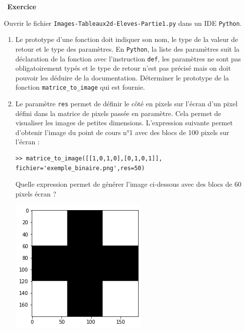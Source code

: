 \documentclass[a4paper, french, 12pt]{article}
\newcounter{exo}
\newenvironment{exercice}[1]
{\par \medskip   \addtocounter{exo}{1} \noindent  
\begin{bclogo}[arrondi =0.1,   noborder = true, logo=\bccrayon, marge=4]{~\textbf{Exercice} \textbf{\theexo} {\itshape #1} }  \par}
{
\end{bclogo}
 \par \bigskip }
\newcounter{def}
\newcounter{cours}
\begin{document}
\begin{exercice}{}

Ouvrir le fichier \texttt{Images-Tableaux2d-Eleves-Partie1.py} dans un IDE \texttt{Python}.

\begin{enumerate}
	\item Le prototype d'une fonction doit indiquer son nom, le type de la valeur de retour et le type des paramètres. En \texttt{Python},  la liste des  paramètres suit la déclaration de la fonction avec l'instruction \texttt{def}, les paramètres ne sont pas obligatoirement typés et le type de retour n'est pas précisé mais on doit pouvoir les déduire de la documentation.  
Déterminer le prototype  de la fonction  \texttt{matrice\_to\_image} qui est fournie.
\item Le paramètre \texttt{res} permet de définir le côté en pixels  sur l'écran d'un pixel défini dans la matrice de pixels passée en paramètre. Cela permet de visualiser les images de petites dimensions. L'expression suivante permet d'obtenir l'image du point de cours n°1 avec des blocs de 100 pixels sur l'écran :

\begin{lstlisting}[style=compil]
>> matrice_to_image([[1,0,1,0],[0,1,0,1]], fichier='exemple_binaire.png',res=50)
\end{lstlisting}

Quelle expression permet de générer l'image ci-dessous avec des blocs de 60 pixels écran ?

\begin{center}
\includegraphics[scale=0.4]{images/croix_binaire.png}
\end{center}
\end{enumerate}


\end{exercice}

\vspace*{-20pt}
\end{document}
